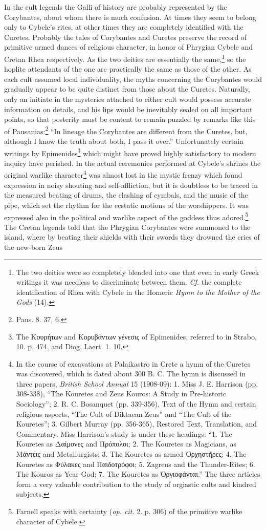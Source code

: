 \documentclass[a4paper, 12pt, oneside]{article}
\begin{document}
In the cult legends the Galli of history are probably represented by the Corybantes, about whom there is much confusion. At times they seem to belong only to Cybele's rites, at other times they are completely identified with the Curetes. Probably the tales of Corybantes and Curetes preserve the record of primitive armed dances of religious character, in honor of Phrygian Cybele and Cretan Rhea respectively. As the two deities are essentially the same,\footnote{The two deities were so completely blended into one that even in early Greek writings it was needless to discriminate between them. \emph{Cf.} the complete identification of Rhea with Cybele in the Homeric \emph{Hymn to the Mother of the Gods} (14).} so the hoplite attendants of the one are practically the same as those of the other. As each cult assumed local individuality, the myths concerning the Corybantes would gradually appear to be quite distinct from those about the Curetes. Naturally, only an initiate in the mysteries attached to either cult would possess accurate information on details, and his lips would be inevitably sealed on all important points, so that posterity must be content to remain puzzled by remarks like this of Pausanias:\footnote{Paus. 8. 37, 6.} ``In lineage the Corybantes are different from the Curetes, but, although I know the truth about both, I pass it over.'' Unfortunately certain writings by Epimenides\footnote{The Κουρήτων and Κορυβάντων γένεσις of Epimenides, referred to in Strabo, 10. p. 474, and Diog. Laert. 1. 10.} which might have proved highly satisfactory to modern inquiry have perished. In the actual ceremonies performed at Cybele's shrines the original warlike character\footnote{In the course of excavations at Palaikastro in Crete a hymn of the Curetes was discovered, which is dated about 300 B. C. The hymn is discussed in three papers, \emph{British School Annual} 15 (1908-09): 1. Miss J. E. Harrison (pp. 308-338), ``The Kouretes and Zeus Kouros: A Study in Pre-historic Sociology''; 2. R. C. Bosanquet (pp. 339-356), Text of the Hymn and certain religious aspects, ``The Cult of Diktaean Zeus'' and ``The Cult of the Kouretes''; 3. Gilbert Murray (pp. 356-365), Restored Text, Translation, and Commentary. Miss Harrison's study is under these headings: ``1. The Kouretes as Δαίμονες and Πρόπολοι; 2. The Kouretes as Magicians, as Μάντεις and Metallurgists; 3. The Kouretes as armed Ὀρχηστῆρες; 4. The Kouretes as Φύλακες and Παιδοτρόφοι; 5. Zagreus and the Thunder-Rites; 6. The Kouros as Year-God; 7. The Kouretes as Ὀργιοφάνται.'' The three articles form a very valuable contribution to the study of orgiastic cults and kindred subjects.} was almost lost in the mystic frenzy which found expression in noisy shouting and self-affliction, but it is doubtless to be traced in the measured beating of drums, the clashing of cymbals, and the music of the pipe, which set the rhythm for the ecstatic motions of the worshippers. It was expressed also in the political and warlike aspect of the goddess thus adored.\footnote{Farnell speaks with certainty (\emph{op. cit.} 2. p. 306) of the primitive warlike character of Cybele.} The Cretan legends told that the Phrygian Corybantes were summoned to the island, where by beating their shields with their swords they drowned the cries of the new-born Zeus 
\end{document}
